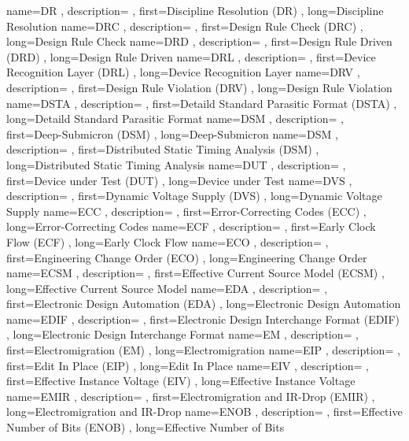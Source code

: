 { name={DR}
, description={}
, first={Discipline Resolution (DR)}
, long={Discipline Resolution}
}
{ name={DRC}
, description={}
, first={Design Rule Check (DRC)}
, long={Design Rule Check}
}
{ name={DRD}
, description={}
, first={Design Rule Driven (DRD)}
, long={Design Rule Driven}
}
{ name={DRL}
, description={}
, first={Device Recognition Layer (DRL)}
, long={Device Recognition Layer}
}
{ name={DRV}
, description={}
, first={Design Rule Violation (DRV)}
, long={Design Rule Violation}
}
{ name={DSTA}
, description={}
, first={Detaild Standard Parasitic Format (DSTA)}
, long={Detaild Standard Parasitic Format}
}
{ name={DSM}
, description={}
, first={Deep-Submicron (DSM)}
, long={Deep-Submicron}
}
{ name={DSM}
, description={}
, first={Distributed Static Timing Analysis (DSM)}
, long={Distributed Static Timing Analysis}
}
{ name={DUT}
, description={}
, first={Device under Test (DUT)}
, long={Device under Test}
}
{ name={DVS}
, description={}
, first={Dynamic Voltage Supply (DVS)}
, long={Dynamic Voltage Supply}
}
{ name={ECC}
, description={}
, first={Error-Correcting Codes (ECC)}
, long={Error-Correcting Codes}
}
{ name={ECF}
, description={}
, first={Early Clock Flow (ECF)}
, long={Early Clock Flow}
}
{ name={ECO}
, description={}
, first={Engineering Change Order (ECO)}
, long={Engineering Change Order}
}
{ name={ECSM}
, description={}
, first={Effective Current Source Model (ECSM)}
, long={Effective Current Source Model}
}
{ name={EDA}
, description={}
, first={Electronic Design Automation (EDA)}
, long={Electronic Design Automation}
}
{ name={EDIF}
, description={}
, first={Electronic Design Interchange Format (EDIF)}
, long={Electronic Design Interchange Format}
}
{ name={EM}
, description={}
, first={Electromigration (EM)}
, long={Electromigration}
}
{ name={EIP}
, description={}
, first={Edit In Place (EIP)}
, long={Edit In Place}
}
{ name={EIV}
, description={}
, first={Effective Instance Voltage (EIV)}
, long={Effective Instance Voltage}
}
{ name={EMIR}
, description={}
, first={Electromigration and IR-Drop (EMIR)}
, long={Electromigration and IR-Drop}
}
{ name={ENOB}
, description={}
, first={Effective Number of Bits (ENOB)}
, long={Effective Number of Bits}
}

